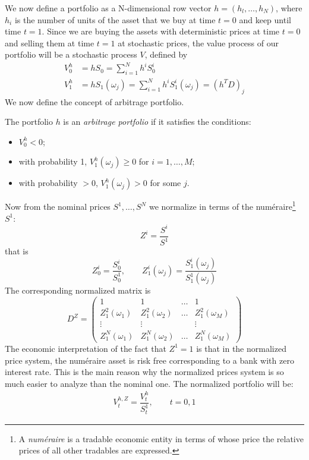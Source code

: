 We now define a portfolio as a N-dimensional row vector $h = (h_l,\dots,h_N)$, where $h_i$ is the number of units of the asset that we buy at time $t = 0$ and keep until time $t = 1$.
Since we are buying the assets with deterministic prices at time $t = 0$ and selling them at time $t = 1$ at stochastic prices, the value process of our portfolio will be a stochastic process $V$, defined by
\begin{align}
    V_0^h &= hS_0 = \sum^N_{i=1}h^i S^i_0 \\
    V_1^h &= hS_1(\omega_j) = \sum^N_{i=1}h^i S^i_1(\omega_j) = (h^TD)_j
\end{align}
We now define the concept of arbitrage portfolio.
\begin{definition}
    The portfolio $h$ is an \emph{arbitrage portfolio} if it satisfies the conditions:
    \begin{itemize}
        \item $V_0^h < 0$;
        \item with probability 1, $V_1^h(\omega_j)\ge0$ for $i=1,\dots,M$;
        \item with probability $>0$, $V_1^h(\omega_j)>0$ for some $j$.
    \end{itemize}
\end{definition}
\noindent Now from the nominal prices $S^1,\dots,S^N$ we normalize in terms of the numéraire\footnote{A \emph{numéraire} is a tradable economic entity in terms of whose price the relative prices of all other tradables are expressed.} $S^1$:
\begin{equation}
    Z^i = \dfrac{S^i}{S^1}
\end{equation}
that is 
\begin{equation*}
    Z^i_0 = \dfrac{S^i_0}{S^1_0}, \qquad Z^i_1(\omega_j) = \dfrac{S^i_1(\omega_j)}{S^1_1(\omega_j)}
\end{equation*}
The corresponding normalized matrix is 
\begin{equation}
    D^Z = \left(
    \begin{matrix}
    1               & 1               & \dots & 1               \\
    Z^2_1(\omega_1) & Z^2_1(\omega_2) & \dots & Z^2_1(\omega_M) \\
    \vdots          & \vdots          &       & \vdots          \\
    Z^N_1(\omega_1) & Z^N_1(\omega_2) & \dots & Z^N_1(\omega_M)
    \end{matrix}
    \right)
\end{equation}
The economic interpretation of the fact that $Z^1 = 1$ is that in the normalized price system, the numéraire asset is risk free corresponding to a bank with zero interest rate. This is the main reason why the normalized prices system is so much easier to analyze than the nominal one. The normalized portfolio will be:
\begin{align}
    V_t^{h,Z} = \dfrac{V_t^h}{S_t^1}, \qquad t=0,1
\end{align} 
